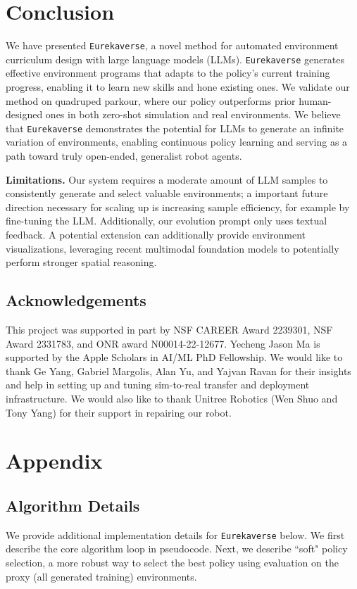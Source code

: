 \documentclass{article}
\newcommand{\ourmethod}{\texttt{Eurekaverse}\xspace}
\begin{document}
\section{Conclusion} 
We have presented \ourmethod, a novel method for automated environment curriculum design with large language models (LLMs). \ourmethod generates effective environment programs that adapts to the policy's current training progress, enabling it to learn new skills and hone existing ones. We validate our method on quadruped parkour, where our policy outperforms prior human-designed ones in both zero-shot simulation and real environments. We believe that \ourmethod demonstrates the potential for LLMs to generate an infinite variation of environments, enabling continuous policy learning and serving as a path toward truly open-ended, generalist robot agents.

\textbf{Limitations.} Our system requires a moderate amount of LLM samples to consistently generate and select valuable environments; a important future direction necessary for scaling up is increasing sample efficiency, for example by fine-tuning the LLM. Additionally, our evolution prompt only uses textual feedback. A potential extension can additionally provide environment visualizations, leveraging recent multimodal foundation models to potentially perform stronger spatial reasoning.

\newpage 

\subsection{Acknowledgements}
This project was supported in part by NSF CAREER Award 2239301, NSF Award 2331783, and ONR award N00014-22-12677. Yecheng Jason Ma is supported by the Apple Scholars in AI/ML PhD Fellowship. We would like to thank Ge Yang, Gabriel Margolis, Alan Yu, and Yajvan Ravan for their insights and help in setting up and tuning sim-to-real transfer and deployment infrastructure. We would also like to thank Unitree Robotics (Wen Shuo and Tony Yang) for their support in repairing our robot.



\newpage 
\appendix 
\section{Appendix}

\subsection{Algorithm Details}
We provide additional implementation details for \ourmethod below. We first describe the core algorithm loop in pseudocode. Next, we describe ``soft" policy selection, a more robust way to select the best policy using evaluation on the proxy (all generated training) environments.
\end{document}
